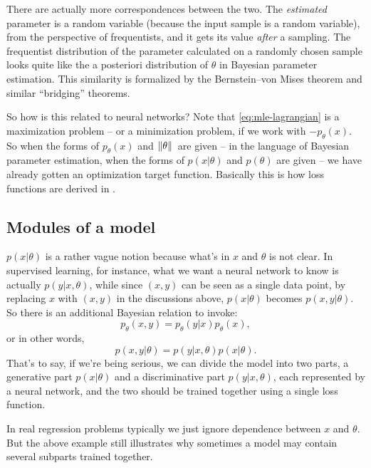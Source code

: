 \documentclass[hyperref, a4paper, 12pt]{report}
\begin{document}
There are actually more correspondences between the two.
The \emph{estimated} parameter is a random variable (because the input sample is a random variable),
from the perspective of frequentists,
and it gets its value \emph{after} a sampling.
The frequentist distribution of the parameter calculated on a randomly chosen sample
looks quite like the a posteriori distribution of $\theta$ in Bayesian parameter estimation.
This similarity is formalized by the Bernstein–von Mises theorem and similar ``bridging'' theorems.

So how is this related to neural networks?
Note that \eqref{eq:mle-lagrangian} is a maximization problem -- or a minimization problem,
if we work with $- p_\theta(x)$.
So when the forms of $p_\theta(x)$ and $\norm*{\theta}$ are given 
-- in the language of Bayesian parameter estimation, when the forms of $p(x | \theta)$ and $p(\theta)$ are given --
we have already gotten an optimization target function.
Basically this is how loss functions are derived in .

\subsection{Modules of a model}

$p(x | \theta)$ is a rather vague notion because what's in $x$ and $\theta$ is not clear.
In supervised learning, for instance,
what we want a neural network to know is actually $p(y | x, \theta)$,
while since $(x, y)$ can be seen as a single data point,
by replacing $x$ with $(x, y)$ in the discussions above,
$p(x | \theta)$ becomes $p(x, y | \theta)$.
So there is an additional Bayesian relation to invoke: 
\begin{equation}
    p_\theta(x, y) = p_\theta(y | x) p_\theta(x),
\end{equation}
or in other words,
\begin{equation}
    p(x, y | \theta) = p(y | x, \theta) p(x | \theta).
\end{equation}
That's to say, if we're being serious, we can divide the model into two parts,
a generative part $p(x | \theta)$ and a discriminative part $p(y | x, \theta)$,
each represented by a neural network,
and the two should be trained together using a single loss function.

In real regression problems typically we just ignore dependence between $x$ and $\theta$.
But the above example still illustrates why sometimes a model may contain several subparts
trained together.
\end{document}
